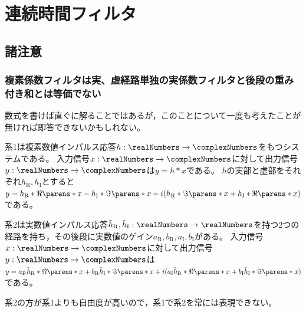\chapter{連続時間フィルタ}
    \section{諸注意}
        \subsection{複素係数フィルタは実、虚経路単独の実係数フィルタと後段の重み付き和とは等価でない}
            数式を書けば直ぐに解ることではあるが，このことについて一度も考えたことが無ければ即答できないかもしれない。
            \par
            系1は複素数値インパルス応答$h:\realNumbers\to\complexNumbers$をもつシステムである。
            入力信号$x:\realNumbers\to\complexNumbers$に対して出力信号$y:\realNumbers\to\complexNumbers$は$y = h*x$である。
            $h$の実部と虚部をそれぞれ$h_\mathrm{R},h_\mathrm{I}$とすると$y = h_\mathrm{R}*\Re\parens*{x} - h_\mathrm{I}*\Im\parens*{x} + i(h_\mathrm{R}*\Im\parens*{x} + h_\mathrm{I}*\Re\parens*{x})$である。
            \par
            系2は実数値インパルス応答$\tilde{h}_\mathrm{R},\tilde{h}_\mathrm{I}:\realNumbers\to\realNumbers$を持つ2つの経路を持ち，その後段に実数値のゲイン$a_\mathrm{R},b_\mathrm{R},a_\mathrm{I},b_\mathrm{I}$がある。
            入力信号$x:\realNumbers\to\complexNumbers$に対して出力信号$y:\realNumbers\to\complexNumbers$は$y = a_\mathrm{R}\tilde{h}_\mathrm{R}*\Re\parens*{x} + b_\mathrm{R}\tilde{h}_\mathrm{I}*\Im\parens*{x} + i(a_\mathrm{I}\tilde{h}_\mathrm{R}*\Re\parens*{x} + b_\mathrm{I}\tilde{h}_\mathrm{I}*\Im\parens*{x})$である。
            \par
            系2の方が系1よりも自由度が高いので，系1で系2を常には表現できない。